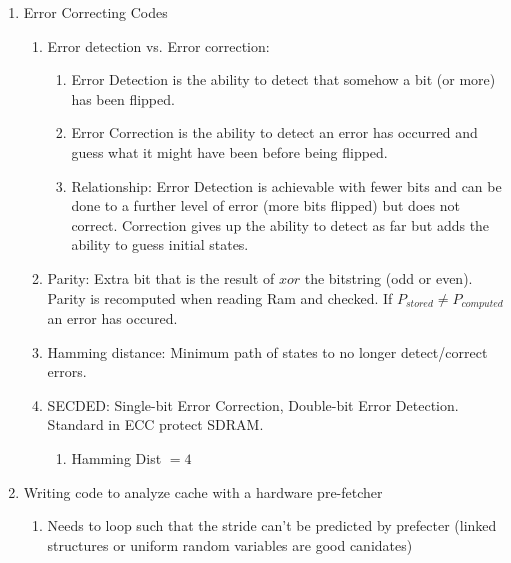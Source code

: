 \documentclass[12pt]{article}
\renewcommand{\=}[1]{\stackrel{#1}{=}} %
\theoremstyle{definition}
\theoremstyle{remark}
\begin{document}
\begin{enumerate}
    \begin{enumerate}
    \item Error Correcting Codes
      \begin{enumerate}
      \item Error detection vs. Error correction:
        \begin{enumerate}
        \item Error Detection is the ability to detect that somehow a
          bit (or more) has been flipped.
        \item Error Correction is the ability to detect an error has
          occurred and guess what it might have been before being flipped.
        \item Relationship: Error Detection is achievable with fewer
          bits and can be done to a further level of error (more bits
          flipped) but does not correct. Correction gives up the
          ability to detect as far but adds the ability to guess
          initial states.
        \end{enumerate}
      \item Parity: Extra bit that is the result of $xor$ the bitstring
        (odd or even). Parity is recomputed when reading Ram and
        checked. If $P_{stored} \neq P_{computed}$ an error has occured.
      \item Hamming distance: Minimum path of states to no longer
        detect/correct errors.
      \item SECDED: Single-bit Error Correction, Double-bit Error
        Detection. Standard in ECC protect SDRAM.
        \begin{enumerate}
        \item Hamming Dist $ = 4$
        \end{enumerate}

      \end{enumerate}

    \item Writing code to analyze cache with a hardware pre-fetcher
      \begin{enumerate}
      \item Needs to loop such that the stride can't be predicted by
        prefecter (linked structures or uniform random
        variables are good canidates)
      \end{enumerate}

    \end{enumerate}

  \end{enumerate}
\end{document}
